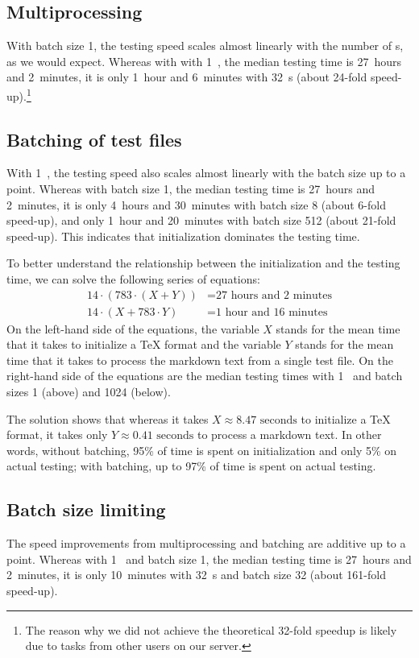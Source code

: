 \documentclass[final]{ltugboat}
\begin{document}
\subsection{Multiprocessing}
With batch size 1, the testing speed scales almost linearly with the number of s, as we would expect. Whereas with with 1~, the median testing time is 27~hours and 2~minutes, it is only 1~hour and 6~minutes with 32~s (about 24-fold speed-up).\footnote{%
The reason why we did not achieve the theoretical 32-fold speedup is likely due to tasks from other users on our server.%
}

\subsection{Batching of test files}
With 1~, the testing speed also scales almost linearly with the batch size up to a point. Whereas with batch size 1, the median testing time is 27~hours and 2~minutes, it is only 4~hours and 30~minutes with batch size 8 (about 6-fold speed-up), and only 1~hour and 20~minutes with batch size 512 (about 21-fold speed-up). This indicates that initialization dominates the testing time.

To better understand the relationship between the initialization and the testing time, we can solve the following series of equations:
\begin{align*}
    14\cdot(783\cdot(X + Y)) &= \text{27 hours and 2 minutes} \\
    14\cdot(X + 783\cdot Y) &= \text{1 hour and 16 minutes}
\end{align*}
On the left-hand side of the equations, the variable $X$ stands for the mean time that it takes to initialize a \TeX{} format and the variable $Y$ stands for the mean time that it takes to process the markdown text from a single test file. On the right-hand side of the equations are the median testing times with 1~ and batch sizes 1 (above) and 1024 (below).

The solution shows that whereas it takes $X\approx\text{8.47 seconds}$ to initialize a \TeX{} format, it takes only $Y\approx\text{0.41 seconds}$ to process a markdown text. In other words, without batching, 95\% of time is spent on initialization and only 5\% on actual testing; with batching, up to 97\% of time is spent on actual testing.

\subsection{Batch size limiting}
The speed improvements from multiprocessing and batching are additive up to a point. Whereas with 1~ and batch size 1, the median testing time is 27~hours and 2~minutes, it is only 10~minutes with 32~s and batch size 32 (about 161-fold speed-up).
\end{document}
